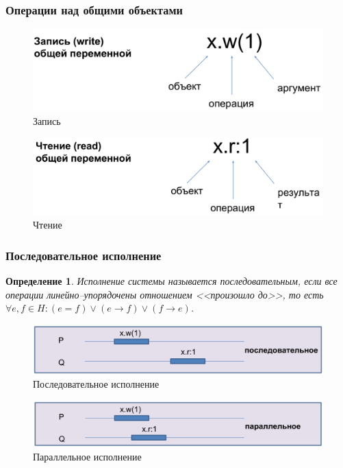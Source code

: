 \documentclass[10pt,a4paper,oneside,titlepage]{article}
\theoremstyle{plain}
\theoremstyle{defenition}
\newtheorem*{defenition}{Определение}
\begin{document}
\subsubsection{Операции над общими объектами}
\begin{figure}[h!]
	\centering
	\includegraphics[width=0.6\linewidth]{pictures/Write}
	\caption{Запись}
	\label{fig:write}
\end{figure}

\begin{figure}[h!]
	\centering
	\includegraphics[width=0.6\linewidth]{pictures/Read}
	\caption{Чтение}
	\label{fig:read}
\end{figure}


\subsubsection{Последовательное исполнение}
\begin{defenition}
	Исполнение системы называется последовательным, если все операции линейно--упорядочены отношением <<произошло до>>, то есть $\forall e, f\in H\colon (e=f)\vee(e\to f)\vee(f\to e)$.
\end{defenition}

\begin{figure}
	\centering
	\includegraphics[width=0.4\linewidth]{pictures/Model4}
	\caption{Последовательное исполнение}
	\label{fig:model4}
\end{figure}

\begin{figure}
	\centering
	\includegraphics[width=0.4\linewidth]{pictures/Model5}
	\caption{Параллельное исполнение}
	\label{fig:model5}
\end{figure}
\end{document}
